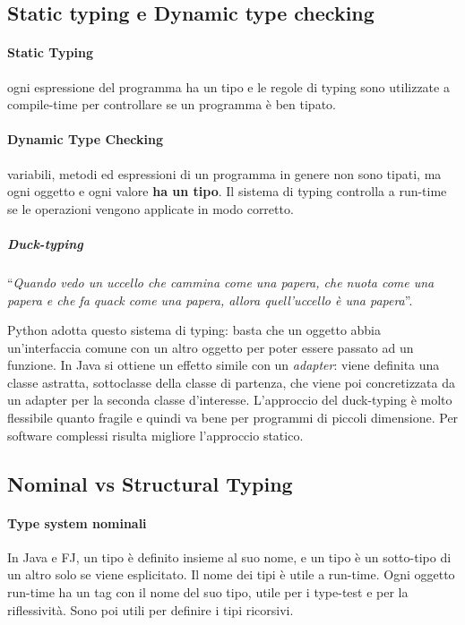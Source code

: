 \subsection{Static typing e Dynamic type checking}

\paragraph{Static Typing} ogni espressione del programma ha un tipo e le regole di typing sono utilizzate a compile-time per controllare se un programma è ben tipato.

\paragraph{Dynamic Type Checking} variabili, metodi ed espressioni di un programma in genere non sono tipati, ma ogni oggetto e ogni valore \textbf{ha un tipo}. Il sistema di typing controlla a run-time se le operazioni vengono applicate in modo corretto.

\subparagraph{Duck-typing} ``\textit{Quando vedo un uccello che cammina come una papera, che nuota come una papera e che fa quack come una papera, allora quell'uccello è una papera}''.

Python adotta questo sistema di typing: basta che un oggetto abbia un'interfaccia comune con un altro oggetto per poter essere passato ad un funzione. In Java si ottiene un effetto simile con un \textit{adapter}: viene definita una classe astratta, sottoclasse della classe di partenza, che viene poi concretizzata da un adapter per la seconda classe d'interesse. L'approccio del duck-typing è molto flessibile quanto fragile e quindi va bene per programmi di piccoli dimensione. Per software complessi risulta migliore l'approccio statico.

\subsection{Nominal vs Structural Typing}

\paragraph{Type system nominali} In Java e FJ, un tipo è definito insieme al suo nome, e un tipo è un sotto-tipo di un altro solo se viene esplicitato. 
Il nome dei tipi è utile a run-time. Ogni oggetto run-time ha un tag con il nome del suo tipo, utile per i type-test e per la riflessività. Sono poi utili per definire i tipi ricorsivi.

